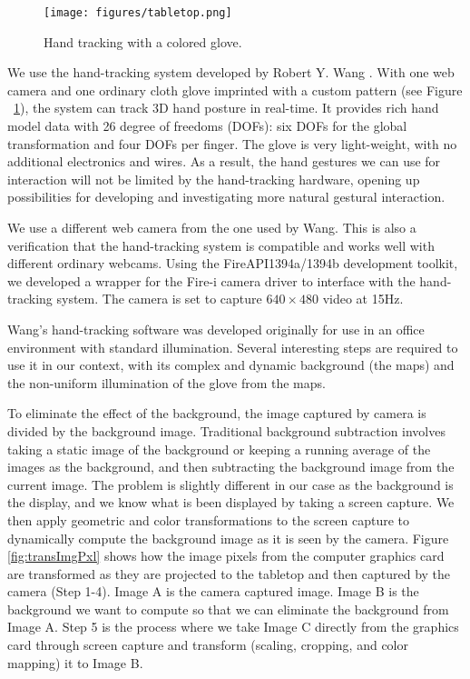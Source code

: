 \begin{figure}
	\centering
	\texttt{[image: figures/tabletop.png]} 
	\caption{Hand tracking with a colored glove.} \label{fig:tabletop}
\end{figure}

We use the hand-tracking system developed by Robert Y. Wang \cite{Wang09}. With one web camera and one ordinary cloth glove imprinted with a custom pattern (see Figure ~\ref{fig:tabletop}), the system can track 3D hand posture in real-time. It provides rich hand model data with 26 degree of freedoms (DOFs): six DOFs for the global transformation and four DOFs per finger. The glove is very light-weight, with no additional electronics and wires. As a result, the hand gestures we can use for interaction will not be limited by the hand-tracking hardware, opening up possibilities for developing and investigating more natural gestural interaction.

We use a different web camera from the one used by Wang. This is also a verification that the hand-tracking system is compatible and works well with different ordinary webcams. Using the FireAPI\texttrademark 1394a/1394b development toolkit, we developed a wrapper for the Fire-i camera driver to interface with the hand-tracking system. The camera is set to capture $640 \times 480$ video at 15Hz.  

Wang's hand-tracking software was developed originally for use in an office environment with standard illumination. Several interesting steps are required to use it in our context, with its complex and dynamic background (the maps) and the non-uniform illumination of the glove from the maps. 

To eliminate the effect of the background, the image captured by camera is divided by the background image. Traditional background subtraction involves taking a static image of the background or keeping a running average of the images as the background, and then subtracting the background image from the current image. The problem is slightly different in our case as the background is the display, and we know what is been displayed by taking a screen capture. We then apply geometric and color transformations to the screen capture to dynamically compute the background image as it is seen by the camera. Figure \ref{fig:transImgPxl} shows how the image pixels from the computer graphics card are transformed as they are projected to the tabletop and then captured by the camera (Step 1-4). Image A is the camera captured image. Image B is the background we want to compute so that we can eliminate the background from Image A. Step 5 is the process where we take Image C directly from the graphics card through screen capture and transform (scaling, cropping, and color mapping) it to Image B.

